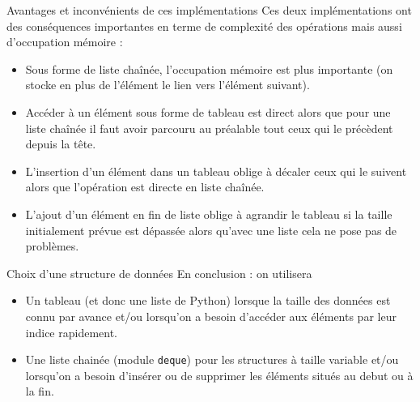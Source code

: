 \documentclass[10pt]{beamer}
\begin{document}
\begin{frame}
	\begin{block}{Avantages et inconvénients de ces implémentations}
		Ces deux implémentations ont des conséquences importantes en terme de complexité des opérations mais aussi d'occupation mémoire :
		\begin{itemize}
			\item<1-> Sous forme de liste chaînée, l'occupation mémoire est plus importante (on stocke en plus de l'élément le lien vers l'élément suivant).
			\item<2-> Accéder à un élément sous forme de tableau est direct alors que pour une liste chaînée il faut avoir parcouru au préalable tout ceux qui le précèdent depuis la tête.
			\item<3-> L'insertion d'un élément dans un tableau oblige à décaler ceux qui le suivent alors que l'opération est directe en liste chaînée.
			\item<4-> L'ajout d'un élément en fin de liste oblige à agrandir le tableau si la taille initialement prévue est dépassée alors qu'avec une liste cela ne pose pas de problèmes.
		\end{itemize}
	\end{block}
\end{frame}

\begin{frame}
	\begin{alertblock}{Choix d'une structure de données}
		En conclusion : on utilisera
		\begin{itemize}
			\item<2-> Un tableau (et donc une liste de Python) lorsque la taille des données est connu par avance  et/ou lorsqu'on a besoin d'accéder aux éléments par leur indice rapidement.
			\item<3-> Une liste chainée (module {\tt deque}) pour les structures à taille variable et/ou lorsqu'on a besoin d'insérer ou de supprimer les éléments situés au debut ou à la fin.
		\end{itemize}
	\end{alertblock}
\end{frame}
\end{document}
